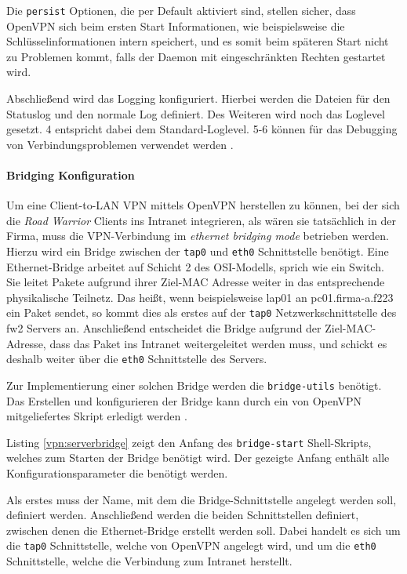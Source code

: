 Die \texttt{persist} Optionen, die per Default aktiviert sind, stellen sicher, dass OpenVPN sich beim ersten Start Informationen, wie beispielsweise die Schlüsselinformationen intern speichert, und es somit beim späteren Start nicht zu Problemen kommt, falls der Daemon mit eingeschränkten Rechten gestartet wird.

Abschließend wird das Logging konfiguriert. Hierbei werden die Dateien für den Statuslog und den normale Log definiert. Des Weiteren wird noch das Loglevel gesetzt. 4 entspricht dabei dem Standard-Loglevel. 5-6 können für das Debugging von Verbindungsproblemen verwendet werden \cite{OpenVPN}.

\paragraph{Bridging Konfiguration}

Um eine Client-to-LAN VPN mittels OpenVPN herstellen zu können, bei der sich die \emph{Road Warrior} Clients ins Intranet integrieren, als wären sie tatsächlich in der Firma, muss die VPN-Verbindung im \emph{ethernet bridging mode} betrieben werden. Hierzu wird ein Bridge zwischen der \texttt{tap0} und \texttt{eth0} Schnittstelle benötigt. Eine Ethernet-Bridge arbeitet auf Schicht 2 des OSI-Modells, sprich wie ein Switch. Sie leitet Pakete aufgrund ihrer Ziel-MAC Adresse weiter in das entsprechende physikalische Teilnetz. Das heißt, wenn beispielsweise lap01 an pc01.firma-a.f223 ein Paket sendet, so kommt dies als erstes auf der \texttt{tap0} Netzwerkschnittstelle des fw2 Servers an. Anschließend entscheidet die Bridge aufgrund der Ziel-MAC-Adresse, dass das Paket ins Intranet weitergeleitet werden muss, und schickt es deshalb weiter über die \texttt{eth0} Schnittstelle des Servers.

Zur Implementierung einer solchen Bridge werden die \texttt{bridge-utils} benötigt. Das Erstellen und konfigurieren der Bridge kann durch ein von OpenVPN mitgeliefertes Skript erledigt werden \cite{OpenVPN}.



Listing \ref{vpn:serverbridge} zeigt den Anfang des \texttt{bridge-start} Shell-Skripts, welches zum Starten der Bridge benötigt wird. Der gezeigte Anfang enthält alle Konfigurationsparameter die benötigt werden.

Als erstes muss der Name, mit dem die Bridge-Schnittstelle angelegt werden soll, definiert werden. Anschließend werden die beiden Schnittstellen definiert, zwischen denen die Ethernet-Bridge erstellt werden soll. Dabei handelt es sich um die \texttt{tap0} Schnittstelle, welche von OpenVPN angelegt wird, und um die \texttt{eth0} Schnittstelle, welche die Verbindung zum Intranet herstellt.

